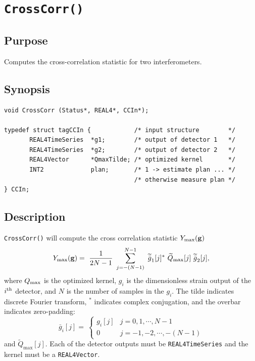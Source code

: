 \documentclass{article}
\begin{document}
\section{\tt{CrossCorr()}}

\subsection{Purpose}

Computes the cross-correlation statistic for two interferometers.  

\subsection{Synopsis}

\begin{verbatim}
void CrossCorr (Status*, REAL4*, CCIn*);

typedef struct tagCCIn {            /* input structure        */
       REAL4TimeSeries  *g1;        /* output of detector 1   */
       REAL4TimeSeries  *g2;        /* output of detector 2   */
       REAL4Vector      *QmaxTilde; /* optimized kernel       */
       INT2             plan;       /* 1 -> estimate plan ... */
                                    /* otherwise measure plan */
} CCIn;
\end{verbatim}

\subsection{Description}

{\tt CrossCorr()\/} will compute
the cross correlation statistic $\sl{Y}_{\mathrm{max}}({ \bf{g} }) $
%
\begin{equation}
\label{ymax}
\sl{Y}_{\mathrm{max}}({ \bf{g} })=\
\frac{1}{2N-1}\
\sum_{j=-(N-1)}^{N-1}\
\widetilde{\bar{g}}_{1}[j]^*\
\widetilde{Q}_{\mathrm{max}}[j]\
\widetilde{\bar{g}}_{2}[j],
\end{equation}
%
where $Q_{\rm{max}}$ is the optimized 
kernel, $g_i$ is the dimensionless strain output of the $i^{\rm{th}}$ detector, and $N$ is the number of
samples in the $g_i$. The tilde indicates discrete Fourier transform, $^{*}$ indicates complex conjugation, 
and the overbar indicates zero-padding:
%
\begin{equation}\nonumber
\bar{g}_{i}[j]=\
\left\{ \begin{array}{cl}
	g_{i}[j]  &    j = 0, 1, \cdots, N-1 \\
	0         &    j = -1, -2, \cdots, -(N-1)
	\end{array}
\right.
\end{equation}
%
and $\widetilde{Q}_{\mathrm{max}}[j]$.  Each of the detector outputs must be 
{\tt REAL4TimeSeries} and the kernel must be a {\tt REAL4Vector}.
\end{document}
